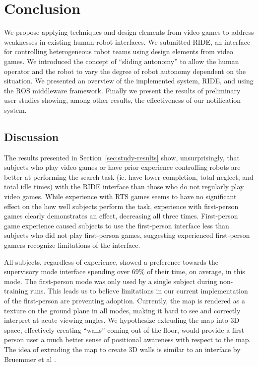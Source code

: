 \chapter{Conclusion}

We propose applying techniques and design elements from video games to address weaknesses in existing human-robot interfaces. We submitted RIDE, an interface for controlling heterogeneous robot teams using design elements from video games. We introduced the concept of ``sliding autonomy'' to allow the human operator and the robot to vary the degree of robot autonomy dependent on the situation. We presented an overview of the implemented system, RIDE, and using the ROS middleware framework. Finally we present the results of preliminary user studies showing, among other results, the effectiveness of our notification system.

\section{Discussion} %
\label{sec:discussion}

The results presented in Section~\ref{sec:study-results} show, unsurprisingly, that subjects who play video games or have prior experience controlling robots are better at performing the search task (ie. have lower completion, total neglect, and total idle times) with the RIDE interface than those who do not regularly play video games. While experience with RTS games seems to have no significant effect on the how well subjects perform the task, experience with first-person games clearly demonstrates an effect, decreasing all three times. First-person game experience caused subjects to use the first-person interface less than subjects who did not play first-person games, suggesting experienced first-person gamers recognize limitations of the interface.

All subjects, regardless of experience, showed a preference towards the supervisory mode interface spending over 69\% of their time, on average, in this mode. The first-person mode was only used by a single subject during non-training runs. This leads us to believe limitations in our current implementation of the first-person are preventing adoption. Currently, the map is rendered as a texture on the ground plane in all modes, making it hard to see and correctly interpret at acute viewing angles. We hypothesize extruding the map into 3D space, effectively creating ``walls'' coming out of the floor, would provide a first-person user a much better sense of positional awareness with respect to the map. The idea of extruding the map to create 3D walls is similar to an interface by Bruemmer et al \cite{Bruemmer05turnoff}.

